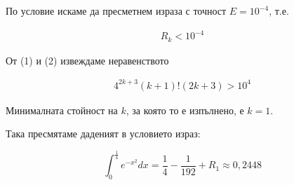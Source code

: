 \documentclass{article}
\begin{document}
По условие искаме да пресметнем израза с точност \( E = 10^{-4} \), т.е.

\begin{gather}
    R_k < 10^{-4}
\end{gather}

От (1) и (2) извеждаме неравенството

\begin{gather}
    4^{2k+3}(k+1)!(2k+3) > 10^4
\end{gather}

Минималната стойност на \( k \), за която то е изпълнено, е \( k = 1 \).

Така пресмятаме даденият в условието израз:

\[
    \int_0^\frac{1}{4}e^{-x^2}dx = \frac{1}{4} - \frac{1}{192} + R_1 \approx 0,2448
\]
\end{document}
